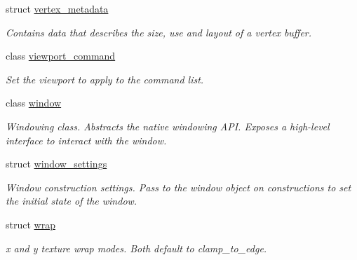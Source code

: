 \begin{DoxyCompactItemize}
struct \mbox{\hyperlink{structmoka_1_1vertex__metadata}{vertex\+\_\+metadata}}
\begin{DoxyCompactList}\small\item\em Contains data that describes the size, use and layout of a vertex buffer. \end{DoxyCompactList}\item 
class \mbox{\hyperlink{classmoka_1_1viewport__command}{viewport\+\_\+command}}
\begin{DoxyCompactList}\small\item\em Set the viewport to apply to the command list. \end{DoxyCompactList}\item 
class \mbox{\hyperlink{classmoka_1_1window}{window}}
\begin{DoxyCompactList}\small\item\em Windowing class. Abstracts the native windowing A\+PI. Exposes a high-\/level interface to interact with the window. \end{DoxyCompactList}\item 
struct \mbox{\hyperlink{structmoka_1_1window__settings}{window\+\_\+settings}}
\begin{DoxyCompactList}\small\item\em Window construction settings. Pass to the window object on constructions to set the initial state of the window. \end{DoxyCompactList}\item 
struct \mbox{\hyperlink{structmoka_1_1wrap}{wrap}}
\begin{DoxyCompactList}\small\item\em x and y texture wrap modes. Both default to clamp\+\_\+to\+\_\+edge. \end{DoxyCompactList}\end{DoxyCompactItemize}
